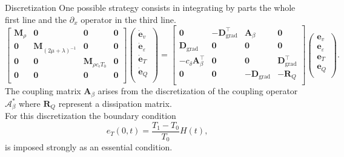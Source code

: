 \documentclass[aspectratio=169]{ISAE-Beamer}
\DeclareMathOperator*{\grad}{grad}
\begin{document}
\begin{frame}{Discretization}
One possible strategy consists in integrating by parts the whole first line and the $\partial_x$ operator in the third line.
\begin{equation*}
\begin{bmatrix}
\mathbf{M}_{\rho} & \mathbf{0} & \mathbf{0} & \mathbf{0}\\
\mathbf{0} & \mathbf{M}_{(2\mu + \lambda)^{-1}} & \mathbf{0} & \mathbf{0} \\
\mathbf{0} & \mathbf{0} & \mathbf{M}_{\rho c_\epsilon T_0} & \mathbf{0} \\
\mathbf{0} & \mathbf{0} & \mathbf{0} & \mathbf{0} \\
\end{bmatrix}
\begin{pmatrix}
\dot{\mathbf{e}}_v\\
\dot{\mathbf{e}}_\varepsilon\\
\dot{\mathbf{e}}_T\\
\dot{\mathbf{e}}_Q\\
\end{pmatrix}
= \begin{bmatrix}
\mathbf{0} & -\mathbf{D}_{\grad}^\top & \mathbf{A}_{\beta} & \mathbf{0}\\
\mathbf{D}_{\grad} & \mathbf{0} & \mathbf{0} & \mathbf{0} \\
-c_\delta \mathbf{A}_{\beta}^\top & \mathbf{0} &  \mathbf{0} & \mathbf{D}_{\grad}^\top \\
\mathbf{0} & \mathbf{0} & -\mathbf{D}_{\grad} & -\mathbf{R}_Q \\
\end{bmatrix}
\begin{pmatrix}
{\mathbf{e}}_v\\
{\mathbf{e}}_\varepsilon\\
{\mathbf{e}}_T\\
{\mathbf{e}}_Q\\
\end{pmatrix}.
\end{equation*}
The coupling matrix $\mathbf{A}_{\beta}$ arises from the discretization of the coupling operator $\mathcal{A}_\beta^*$ where $\mathbf{R}_Q$ represent a dissipation matrix. \\
For this discretization the boundary condition 
\begin{equation*}
e_T(0, t) = \frac{T_1 - T_0}{T_0} H(t), 
\end{equation*}
is imposed strongly as an essential condition.
\end{frame}
\end{document}
